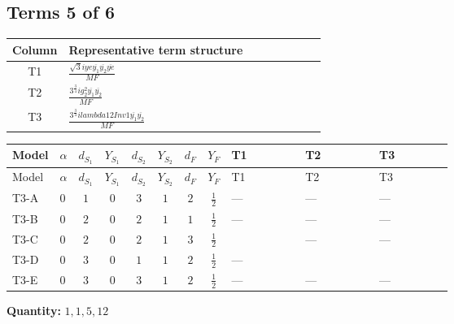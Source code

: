 \documentclass[8pt]{article}
\begin{document}
\begin{landscape}
\subsection*{Terms 5 of 6}
\begin{center}
\begin{tabular}{@{}c >{\raggedright\arraybackslash}p{0.82\linewidth}@{}}
\toprule
Column & Representative term structure \\
\midrule
T1 & \(\displaystyle \frac{\sqrt{3} i ye \overline{y_{1}} \overline{y_{2}} \overline{ye}}{MF}\) \\
\midrule
T2 & \(\displaystyle \frac{3^{\frac{3}{4}} i g_{2}^{2} \overline{y_{1}} \overline{y_{2}}}{MF}\) \\
\midrule
T3 & \(\displaystyle \frac{3^{\frac{3}{4}} i lambda12Inv1 \overline{y_{1}} \overline{y_{2}}}{MF}\) \\
\midrule
\bottomrule
\end{tabular}
\end{center}
\smallskip
\tiny
\begin{longtable}{@{}llcccccc >{\raggedright\arraybackslash}p{0.21\linewidth} >{\raggedright\arraybackslash}p{0.21\linewidth} >{\raggedright\arraybackslash}p{0.21\linewidth}@{}}
\toprule
Model & $\alpha$ & $d_{S_1}$ & $Y_{S_1}$ & $d_{S_2}$ & $Y_{S_2}$ & $d_F$ & $Y_F$ & T1 & T2 & T3 \\
\midrule
\endfirsthead
\toprule
Model & $\alpha$ & $d_{S_1}$ & $Y_{S_1}$ & $d_{S_2}$ & $Y_{S_2}$ & $d_F$ & $Y_F$ & T1 & T2 & T3 \\
\midrule
\endhead
T3-A & $0$ & $1$ & $0$ & $3$ & $1$ & $2$ & $\frac{1}{2}$ & --- & --- & --- \\
\midrule
T3-B & $0$ & $2$ & $0$ & $2$ & $1$ & $1$ & $\frac{1}{2}$ & --- & --- & --- \\
\midrule
T3-C & $0$ & $2$ & $0$ & $2$ & $1$ & $3$ & $\frac{1}{2}$ & \scriptsize\adjustbox{max width=\linewidth}{$\begin{gathered} - \frac{\sqrt{3} i ye \overline{y_{1}} \overline{y_{2}} \overline{ye}}{12 MF}\end{gathered}$} & --- & --- \\
\midrule
T3-D & $0$ & $3$ & $0$ & $1$ & $1$ & $2$ & $\frac{1}{2}$ & --- & \scriptsize\adjustbox{max width=\linewidth}{$\begin{gathered} - \frac{17 \cdot 3^{\frac{3}{4}} i g_{2}^{2} \overline{y_{1}} \overline{y_{2}}}{24 MF}\end{gathered}$} & \scriptsize\adjustbox{max width=\linewidth}{$\begin{gathered} - \frac{3^{\frac{3}{4}} i lambda12Inv1 \overline{y_{1}} \overline{y_{2}}}{6 MF}\end{gathered}$} \\
\midrule
T3-E & $0$ & $3$ & $0$ & $3$ & $1$ & $2$ & $\frac{1}{2}$ & --- & --- & --- \\
\midrule
\bottomrule
\end{longtable}
\clearpage
\noindent\textbf{Quantity: }$\mathrm{1,1,5,12}$\par\smallskip

\end{landscape}
\end{document}
